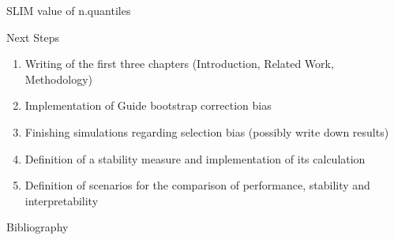 \documentclass[9pt, xcolor=table]{beamer}
\begin{document}
\begin{frame}{SLIM value of n.quantiles}




\end{frame}


\begin{frame}{Next Steps}
\begin{enumerate}
    \item Writing of the first three chapters (Introduction, Related Work, Methodology)
    \item Implementation of Guide bootstrap correction bias 
    \item Finishing simulations regarding selection bias (possibly write down results)
    \item Definition of a stability measure and implementation of its calculation
    \item Definition of scenarios for the comparison of performance, stability and interpretability
\end{enumerate}
    
\end{frame}
    


\begin{frame}{Bibliography}
    
    

\end{frame}
\end{document}
